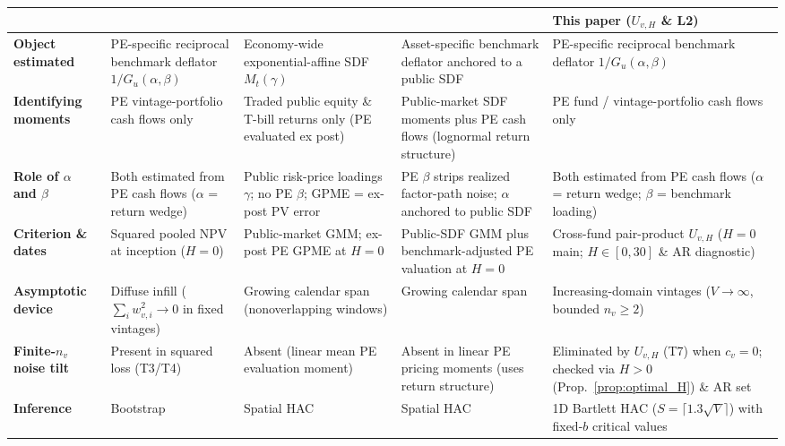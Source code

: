 \begin{table}[htbp]
\centering
\scriptsize
\setlength{\tabcolsep}{4pt}
\begin{tabularx}{\linewidth}{@{}>{\raggedright\arraybackslash}p{2.35cm} >{\raggedright\arraybackslash}X >{\raggedright\arraybackslash}X >{\raggedright\arraybackslash}X >{\raggedright\arraybackslash}X@{}}
\toprule
 & \citet{DLP12} & \citet{KN16} & \citet{KN24} & This paper ($U_{v,H}$ \& L2) \\
\midrule
\textbf{Object estimated} & PE-specific reciprocal benchmark deflator $1/G_u(\alpha,\beta)$ & Economy-wide exponential-affine SDF $M_t(\gamma)$ & Asset-specific benchmark deflator anchored to a public SDF & PE-specific reciprocal benchmark deflator $1/G_u(\alpha,\beta)$ \\
\addlinespace[2pt]
\textbf{Identifying moments} & PE vintage-portfolio cash flows only & Traded public equity \& T-bill returns only (PE evaluated ex post) & Public-market SDF moments plus PE cash flows (lognormal return structure) & PE fund / vintage-portfolio cash flows only \\
\addlinespace[2pt]
\textbf{Role of $\alpha$ and $\beta$} & Both estimated from PE cash flows ($\alpha$ = return wedge) & Public risk-price loadings $\gamma$; no PE $\beta$; GPME = ex-post PV error & PE $\beta$ strips realized factor-path noise; $\alpha$ anchored to public SDF & Both estimated from PE cash flows ($\alpha$ = return wedge; $\beta$ = benchmark loading) \\
\addlinespace[2pt]
\textbf{Criterion \& dates} & Squared pooled NPV at inception ($H=0$) & Public-market GMM; ex-post PE GPME at $H=0$ & Public-SDF GMM plus benchmark-adjusted PE valuation at $H=0$ & Cross-fund pair-product $U_{v,H}$ ($H=0$ main; $H\in[0,30]$ \& AR diagnostic) \\
\addlinespace[2pt]
\textbf{Asymptotic device} & Diffuse infill ($\sum_i w_{v,i}^2 \to 0$ in fixed vintages) & Growing calendar span (nonoverlapping windows) & Growing calendar span & Increasing-domain vintages ($V \to \infty$, bounded $n_v \ge 2$) \\
\addlinespace[2pt]
\textbf{Finite-$n_v$ noise tilt} & Present in squared loss (T3/T4) & Absent (linear mean PE evaluation moment) & Absent in linear PE pricing moments (uses return structure) & Eliminated by $U_{v,H}$ (T7) when $c_v=0$; checked via $H>0$ (Prop.~\ref{prop:optimal_H}) \& AR set \\
\addlinespace[2pt]
\textbf{Inference} & Bootstrap & Spatial HAC \citep{C99} & Spatial HAC & 1D Bartlett HAC ($S=\lceil 1.3\sqrt{V}\rceil$) with \citet{KV05} fixed-$b$ critical values \\

\end{tabularx}
\end{table}

